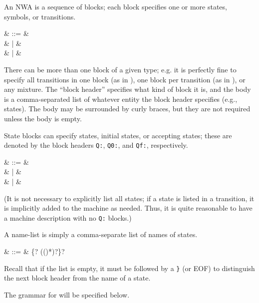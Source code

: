 An NWA is a sequence of blocks; each block specifies one or more
states, symbols, or transitions.

\begin{grammar}
   &  ::= &  \\
                  &    | &  \\
                  &    | & 
\end{grammar}

There can be more than one block of a given type; e.g. it is perfectly fine to
specify all transitions in one block (as in ),
one block per transition (as in ), or
any mixture. The ``block header'' specifies what kind of block
it is, and the body is a comma-separated list of whatever entity the
block header specifies (e.g., states). The body may be surrounded by
curly braces, but they are not required unless the body is empty.

State blocks can specify states, initial states, or accepting states;
these are denoted by
the block headers \texttt{Q:}, \texttt{Q0:}, and \texttt{Qf:},
respectively.
 
\begin{grammar}
   &  ::= &  \cfgsp {} \\
                        &   |  & \cfgsp {} \\
                        &   |  & \cfgsp {}
\end{grammar}

(It is not necessary to explicitly list all states; if a state is
listed in a transition, it is implicitly added to the machine as
needed. Thus, it is quite reasonable to have a machine description with
no \texttt{Q:} blocks.)

A name-list is simply a comma-separate list of names of states.

\begin{grammar}
   & ::= & \term\{? \cfgsp (\cfgsp (\term{,}\cfgsp  {})*)?\cfgsp\term\}?
\end{grammar}

Recall that if the list is empty, it must be followed by a \texttt{\}}
(or EOF) to distinguish the next block header from the name of a
state.

The grammar for  will be specified below.



